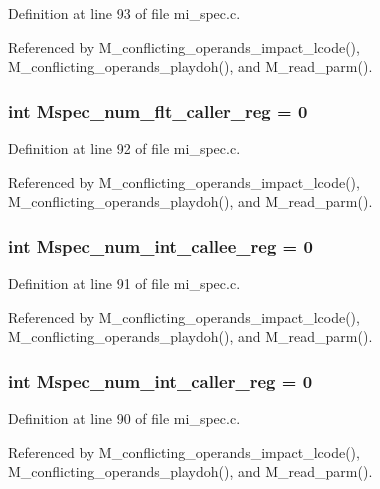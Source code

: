 Definition at line 93 of file mi\_\-spec.c.

Referenced by M\_\-conflicting\_\-operands\_\-impact\_\-lcode(), M\_\-conflicting\_\-operands\_\-playdoh(), and M\_\-read\_\-parm().
\subsubsection{\setlength{\rightskip}{0pt plus 5cm}int \bf{Mspec\_\-num\_\-flt\_\-caller\_\-reg} = 0}\label{mi__spec_8c_b8bd464c66465962e422af686ae35121}




Definition at line 92 of file mi\_\-spec.c.

Referenced by M\_\-conflicting\_\-operands\_\-impact\_\-lcode(), M\_\-conflicting\_\-operands\_\-playdoh(), and M\_\-read\_\-parm().
\subsubsection{\setlength{\rightskip}{0pt plus 5cm}int \bf{Mspec\_\-num\_\-int\_\-callee\_\-reg} = 0}\label{mi__spec_8c_05563f3fc90540403401a7590ae885b0}




Definition at line 91 of file mi\_\-spec.c.

Referenced by M\_\-conflicting\_\-operands\_\-impact\_\-lcode(), M\_\-conflicting\_\-operands\_\-playdoh(), and M\_\-read\_\-parm().
\subsubsection{\setlength{\rightskip}{0pt plus 5cm}int \bf{Mspec\_\-num\_\-int\_\-caller\_\-reg} = 0}\label{mi__spec_8c_4a05d2ec29e2bcb55d1f804e384021ef}




Definition at line 90 of file mi\_\-spec.c.

Referenced by M\_\-conflicting\_\-operands\_\-impact\_\-lcode(), M\_\-conflicting\_\-operands\_\-playdoh(), and M\_\-read\_\-parm().
